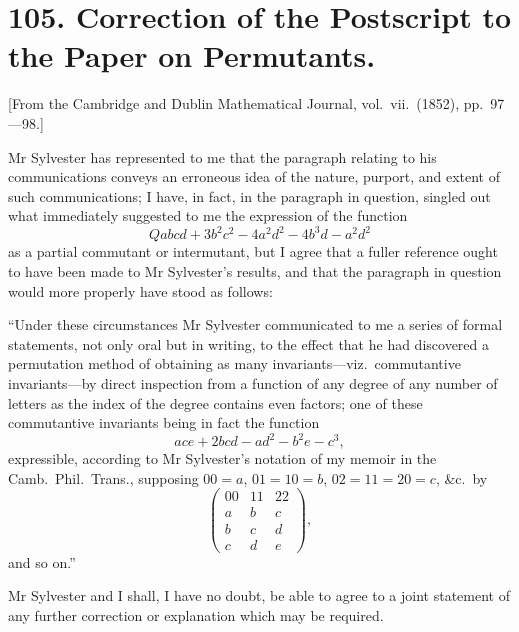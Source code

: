 \documentclass[11pt,a4paper]{article}
\theoremstyle{plain}
\begin{document}
\section*{105. Correction of the Postscript to the Paper on Permutants.}

[From the Cambridge and Dublin Mathematical Journal, vol.\ vii.\ (1852), pp.\ 97---98.]

Mr Sylvester has represented to me that the paragraph relating to his communications conveys an erroneous idea of the nature, purport, and extent of such communications; I have, in fact, in the paragraph in question, singled out what immediately suggested to me the expression of the function
\[Qabcd + 3b^2c^2 - 4a^2d^2 - 4b^3d - a^2d^2\]
as a partial commutant or intermutant, but I agree that a fuller reference ought to have been made to Mr Sylvester's results, and that the paragraph in question would more properly have stood as follows:

``Under these circumstances Mr Sylvester communicated to me a series of formal statements, not only oral but in writing, to the effect that he had discovered a permutation method of obtaining as many invariants---viz.\ commutantive invariants---by direct inspection from a function of any degree of any number of letters as the index of the degree contains even factors; one of these commutantive invariants being in fact the function
\[ace + 2bcd - ad^2 - b^2e - c^3,\]
expressible, according to Mr Sylvester's notation of my memoir in the Camb.\ Phil.\ Trans., supposing $00=a$, $01=10=b$, $02=11=20=c$, \&c.\ by
\[\begin{pmatrix} 00 & 11 & 22 \\ a & b & c \\ b & c & d \\ c & d & e \end{pmatrix},\]
and so on.''

Mr Sylvester and I shall, I have no doubt, be able to agree to a joint statement of any further correction or explanation which may be required.
\clearpage

\end{document}
